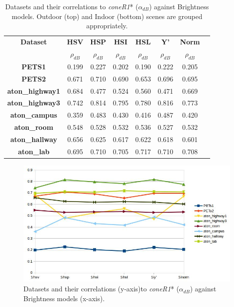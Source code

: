\documentclass[12pt]{report}
\begin{document}
\begin{table}
\centering
\begin{tabular}{ |c|c|c|c|c|c|c|c| }
	\hline
	\textbf{Dataset} & \textbf{HSV} & \textbf{HSP} & \textbf{HSI} & \textbf{HSL}& \textbf{Y'} & \textbf{Norm} \\
		\textbf{} & $\rho_{dB}$ & $\rho_{dB}$ & $\rho_{dB}$ & $\rho_{dB}$ & $\rho_{dB}$ & $\rho_{dB}$ \\
	\hline
	\hline
	\textbf{PETS1} & 0.199 & 0.227 & 0.202 & 0.190 & 0.222 & 0.205 \\
	\hline
	\textbf{PETS2} & 0.671 & 0.710 & 0.690 & 0.653 & 0.696 & 0.695 \\
	\hline
	\textbf{aton\_highway1} & 0.684 & 0.477 & 0.524 & 0.560 & 0.471 & 0.669 \\
	\hline
	\textbf{aton\_highway3} & 0.742 & 0.814 & 0.795 & 0.780 & 0.816 & 0.773 \\
	\hline
	\textbf{aton\_campus} & 0.359 & 0.483 & 0.430 & 0.416 & 0.487 & 0.420 \\
	\hline
	\hline
	\textbf{aton\_room} & 0.548 & 0.528 & 0.532 & 0.536 & 0.527 & 0.532 \\
	\hline
	\textbf{aton\_hallway} & 0.656 & 0.625 & 0.617 & 0.622 & 0.618 & 0.601 \\
	\hline
	\textbf{aton\_lab} & 0.695 & 0.710 & 0.705 & 0.717 & 0.710 & 0.708 \\
	\hline
\end{tabular}
\caption{Datasets and their correlations to \textit{coneR1}* ($\alpha_{dB}$) against Brightness models. Outdoor (top) and Indoor (bottom) scenes are grouped appropriately.}
\label{table:brightness_corr_db}
\end{table}

\begin{figure}
  \includegraphics[width=\linewidth]{figures/brightness/db/correlation_x.jpg}
  \caption{Datasets and their correlations (y-axis)to \textit{coneR1}* ($\alpha_{dB}$) against Brightness models (x-axis).}
\label{fig:brightness_corr_db}
\end{figure}
\end{document}
